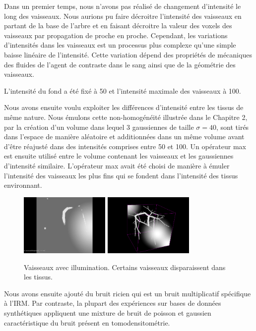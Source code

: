 Dans un premier temps, nous n'avons pas réalisé de changement d'intensité le long des vaisseaux. Nous aurions pu faire décroitre l'intensité des vaisseaux en partant de la base de l'arbre et en faisant décroitre la valeur des voxels des vaisseaux par propagation de proche en proche. Cependant, les variations d'intensités dans les vaisseaux est un processus plus complexe qu'une simple baisse linéaire de l'intensité. Cette variation dépend des propriétés de mécaniques des fluides de l'agent de contraste dans le sang ainsi que de la géométrie des vaisseaux.

L'intensité du fond a été fixé à 50 et l'intensité maximale des vaisseaux à 100. 

Nous avons ensuite voulu exploiter les différences d'intensité entre les tissus de même nature. Nous émulons cette non-homogénéité illustrée dans le Chapitre 2, par la création d'un volume dans lequel 3 gaussiennes de taille $\sigma=40$, sont tirés dans l'espace de manière aléatoire et additionnées dans un même volume avant d'être réajusté dans des intensités comprises entre 50 et 100. Un opérateur max est ensuite utilisé entre le volume contenant les vaisseaux et les gaussiennes d'intensité similaire. L'opérateur max avait été choisi de manière à émuler l'intensité des vaisseaux les plus fins qui se fondent dans l'intensité des tissus environnant.

\begin{figure}
  \centering
  \includegraphics[height=3cm]{Images/2D_VBI.png}
  \includegraphics[height=3cm]{Images/3D_VBI.png}
  \label{fig:VBI}
  \caption{Vaisseaux avec illumination. Certains vaisseaux disparaissent dans les tissus.}
\end{figure}

Nous avons ensuite ajouté du bruit ricien qui est un bruit multiplicatif spécifique à l'IRM. Par contraste, la plupart des expériences sur bases de données synthétiques appliquent une mixture de bruit de poisson et gaussien caractéristique du bruit présent en tomodensitométrie.

